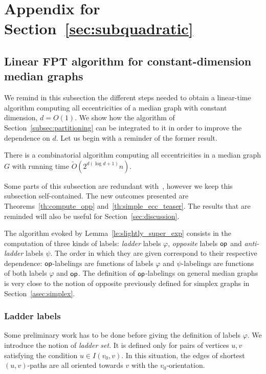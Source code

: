 \documentclass[a4paper,UKenglish,numberwithinsect,cleveref, autoref,anonymous]{lipics-v2021}
\newcommand{\opp}{\mbox{\textsf{op}}}
\begin{document}
\section{Appendix for Section~\ref{sec:subquadratic}} \label{asec:subquadratic}

\subsection{Linear FPT algorithm for constant-dimension median graphs} \label{asubsec:constant_dim}

We remind in this subsection the different steps needed to obtain a linear-time algorithm computing all eccentricities of a median graph with constant dimension, $d=O(1)$. We show how the algorithm of Section~\ref{subsec:partitioning} can be integrated to it in order to improve the dependence on $d$. Let us begin with a reminder of the former result.

\begin{lemma}
There is a combinatorial algorithm computing all eccentricities in a median graph $G$ with running time $\tilde{O}(2^{d(\log d + 1)}n)$.
\label{le:slightly_super_exp}
\end{lemma}

Some parts of this subsection are redundant with~\cite{BeHa21}, however we keep this subsection self-contained. The new outcomes presented are Theorems~\ref{th:compute_opp} and~\ref{th:simple_ecc_teaser}. The results that are reminded will also be useful for Section~\ref{sec:discussion}.

The algorithm evoked by Lemma~\ref{le:slightly_super_exp} consists in the computation of three kinds of labels: \textit{ladder} labels $\varphi$, \textit{opposite} labels $\opp$ and \textit{anti-ladder} labels $\psi$. The order in which they are given correspond to their respective dependence: $\opp$-labelings are functions of labels $\varphi$ and $\psi$-labelings are functions of both labels $\varphi$ and $\opp$.
The definition of $\opp$-labelings on general median graphs is very close to the notion of opposite previously defined for simplex graphs in Section~\ref{asec:simplex}.

\subsubsection{Ladder labels} \label{subsubsec:ladder}

Some preliminary work has to be done before giving the definition of labels $\varphi$. We introduce the notion of \textit{ladder set}. It is defined only for pairs of vertices $u,v$ satisfying the condition $u \in I(v_0,v)$. In this situation, the edges of shortest $(u,v)$-paths are all oriented towards $v$ with the $v_0$-orientation.
\end{document}
